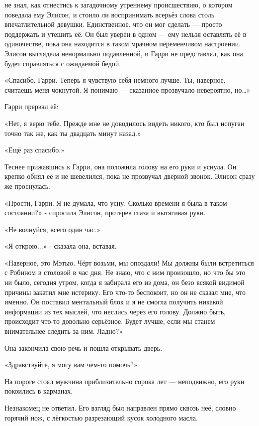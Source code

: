 \documentclass[a4paper,12pt]{book}
\begin{document}
 не знал, как отнестись к загадочному утреннему происшествию, о котором поведала ему Элисон, и стоило ли воспринимать всерьёз слова столь впечатлительной девушки. Единственное, что он мог сделать — просто поддержать и утешить её. Он был уверен в одном — ему нельзя оставлять её в одиночестве, пока она находится в таком мрачном переменчивом настроении. Элисон выглядела ненормально подавленной, и Гарри не представлял, как она будет справляться с ожидаемой бедой.
\par
«Спасибо, Гарри. Теперь я чувствую себя немного лучше. Ты, наверное, считаешь меня чокнутой. Я понимаю — сказанное прозвучало невероятно, но…»
\par
Гарри прервал её:
\par
«Нет, я верю тебе. Прежде мне не доводилось видеть никого, кто был испуган точно так же, как ты двадцать минут назад.»
\par
«Ещё раз спасибо.»
\par
Теснее прижавшись к Гарри, она положила голову на его руки и уснула. Он крепко обнял её и не шевелился, пока не прозвучал дверной звонок. Элисон сразу же проснулась.
\par
«Прости, Гарри. Я не думала, что усну. Сколько времени я была в таком состоянии?» - спросила Элисон, протерев глаза и вытягивая руки.
\par
«Не волнуйся, всего один час.»
\par
«Я открою...» - сказала она, вставая.
\par
«Наверное, это Мэтью. Чёрт возьми, мы опоздали! Мы должны были встретиться с Робином в столовой в час дня. Не знаю, что с ним произошло, но что бы это ни было, сегодня утром, когда я забирала его из дома, он безо всякой видимой причины закатил мне истерику. Его что-то беспокоит, но он не сказал мне, что именно. Он поставил ментальный блок и я не смогла получить никакой информации из тех мыслей, что неслись через его голову. Должно быть, происходит что-то довольно серьёзное. Будет лучше, если мы станем внимательнее следить за ним. Ладно?»
\par
Она закончила свою речь и пошла открывать дверь.\\
\par
«Здравствуйте, я могу вам чем-то помочь?»
\par
На пороге стоял мужчина приблизительно сорока лет — неподвижно, его руки покоились в карманах.
\par
Незнакомец не ответил. Его взгляд был направлен прямо сквозь неё, словно горячий нож, с лёгкостью разрезающий кусок холодного масла.
\end{document}
